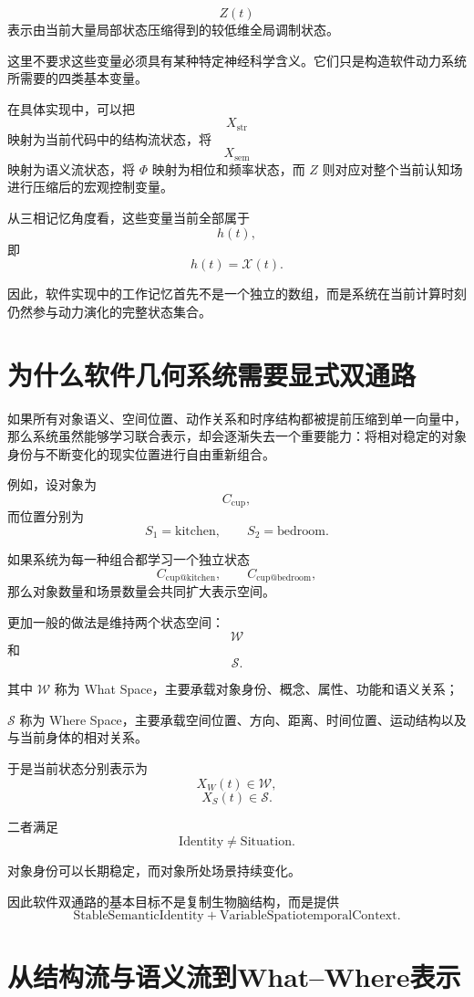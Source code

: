 \[
Z(t)
\]
表示由当前大量局部状态压缩得到的较低维全局调制状态。

这里不要求这些变量必须具有某种特定神经科学含义。它们只是构造软件动力系统所需要的四类基本变量。

在具体实现中，可以把
\[
X_{\mathrm{str}}
\]
映射为当前代码中的结构流状态，将
\[
X_{\mathrm{sem}}
\]
映射为语义流状态，将 $\Phi$ 映射为相位和频率状态，而 $Z$ 则对应对整个当前认知场进行压缩后的宏观控制变量。

从三相记忆角度看，这些变量当前全部属于
\[
h(t),
\]
即
\[
\boxed{
h(t)
=
\mathcal{X}(t).
}
\]

因此，软件实现中的工作记忆首先不是一个独立的数组，而是系统在当前计算时刻仍然参与动力演化的完整状态集合。

\section{为什么软件几何系统需要显式双通路}

如果所有对象语义、空间位置、动作关系和时序结构都被提前压缩到单一向量中，那么系统虽然能够学习联合表示，却会逐渐失去一个重要能力：将相对稳定的对象身份与不断变化的现实位置进行自由重新组合。

例如，设对象为
\[
C_{\mathrm{cup}},
\]
而位置分别为
\[
S_1=\mathrm{kitchen},
\qquad
S_2=\mathrm{bedroom}.
\]

如果系统为每一种组合都学习一个独立状态
\[
C_{\mathrm{cup@kitchen}},
\qquad
C_{\mathrm{cup@bedroom}},
\]
那么对象数量和场景数量会共同扩大表示空间。

更加一般的做法是维持两个状态空间：
\[
\boxed{
\mathcal{W}
}
\]
和
\[
\boxed{
\mathcal{S}.
}
\]

其中 $\mathcal{W}$ 称为 What Space，主要承载对象身份、概念、属性、功能和语义关系；

$\mathcal{S}$ 称为 Where Space，主要承载空间位置、方向、距离、时间位置、运动结构以及与当前身体的相对关系。

于是当前状态分别表示为
\[
X_W(t)\in\mathcal{W},
\]
\[
X_S(t)\in\mathcal{S}.
\]

二者满足
\[
\boxed{
\mathrm{Identity}
\neq
\mathrm{Situation}.
}
\]

对象身份可以长期稳定，而对象所处场景持续变化。

因此软件双通路的基本目标不是复制生物脑结构，而是提供
\[
\boxed{
\mathrm{StableSemanticIdentity}
+
\mathrm{VariableSpatiotemporalContext}.
}
\]

\section{从结构流与语义流到What--Where表示}

